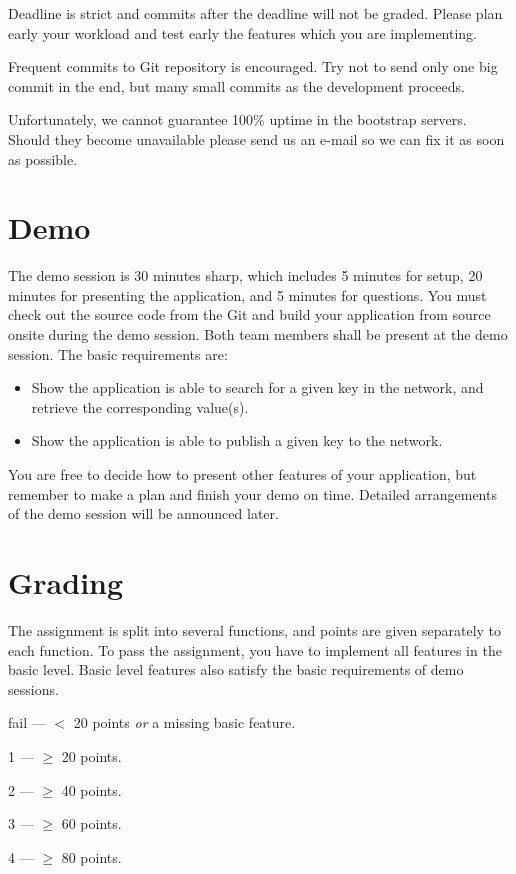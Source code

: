 \documentclass[12pt, a4paper]{article}
\begin{document}
Deadline is strict and commits after the deadline will not be graded.
Please plan early your workload and test early the features which you are implementing.

Frequent commits to Git repository is encouraged.
Try not to send only one big commit in the end, but many small commits as the development proceeds.

Unfortunately, we cannot guarantee 100\% uptime in the bootstrap servers.
Should they become unavailable please send us an e-mail so we can fix it as soon as possible.


\section{Demo}
The demo session is 30 minutes sharp, which includes 5 minutes for setup, 20 minutes for presenting the application, and 5 minutes for questions.
You must check out the source code from the Git and build your application from source onsite during the demo session.
Both team members shall be present at the demo session.
The basic requirements are:
\begin{itemize}
\item Show the application is able to search for a given key in the network, and retrieve the corresponding value(s).
\item Show the application is able to publish a given key to the network.
\end{itemize}
You are free to decide how to present other features of your application, but remember to make a plan and finish your demo on time.
Detailed arrangements of the demo session will be announced later.


\section{Grading}
The assignment is split into several functions, and points are given separately to each function.
To pass the assignment, you have to implement all features in the basic level.
Basic level features also satisfy the basic requirements of demo sessions.

\vskip 20pt

fail --- $<$ 20 points \emph{or} a missing basic feature.

1 --- $\ge$ 20 points.

2 --- $\ge$  40 points.

3 --- $\ge$ 60 points.

4 --- $\ge$ 80 points.
\end{document}

